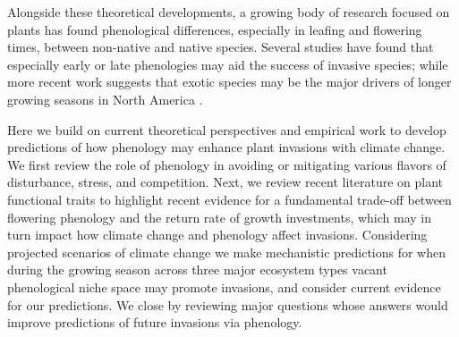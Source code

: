 \documentclass[11pt,a4paper,oneside]{article}
\begin{document}
Alongside these theoretical developments, a growing body of research focused on plants has found phenological differences, especially in leafing and flowering times, between non-native and native species. Several studies have found that especially early \citep{mcewan2009,Wilsey:2011cr,throop2012,Wainwright:2012tw} or late \citep{Godoy:2009dz,Fridley:2012fj,paquette2012,Pearson:2012uq} phenologies may aid the success of invasive species; while more recent work suggests that exotic species may be the major drivers of longer growing seasons in North America \citep{wolkovichAmBot2013}. 

Here we build on current theoretical perspectives and empirical work to develop predictions of how phenology may enhance plant invasions with climate change. We first review the role of phenology in avoiding or mitigating various flavors of disturbance, stress, and competition. Next, we review recent literature on plant functional traits to highlight recent evidence for a fundamental trade-off between flowering phenology and the return rate of growth investments, which may in turn impact how climate change and phenology affect invasions. Considering projected scenarios of climate change we make mechanistic predictions for when during the growing season across three major ecosystem types vacant phenological niche space may promote invasions, and consider current evidence for our predictions. We close by reviewing major questions whose answers would improve predictions of future invasions via phenology.\\

\\
\end{document}

